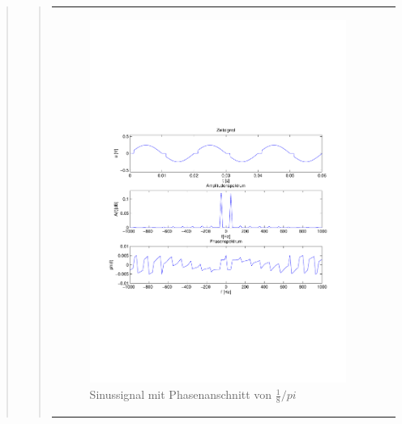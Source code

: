 \begin{quote}
\begin{quote}
\begin{center}
\begin{tabular}{ll}
\begin{minipage}{0.6\textwidth}
                \end{minipage}
                \begin{minipage}{0.6\textwidth}

                    \begin{figure}[H]
                        \label{fig:}
                        \includegraphics[scale=0.5, trim = 2cm 7cm 1.5cm 8.5cm, clip]{./Bilder/Phasenanschnitt18pi.pdf}
                        \caption{Sinussignal mit Phasenanschnitt von $\frac{1}{8}/pi$}
                    \end{figure}
                \vspace{-1.5em}

                \end{minipage}

            \end{tabular}
            \end{center}


\end{quote}
\end{quote}
